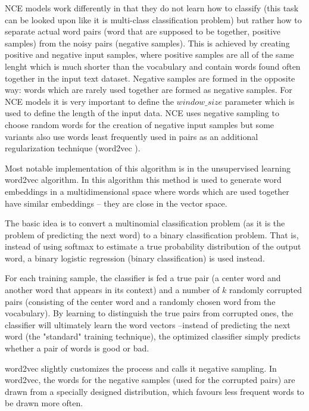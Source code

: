 \documentclass[b5paper]{book}
\let\cite\parencite
\begin{document}
NCE models work differently in that they do not learn how to classify (this task can be looked upon like it is multi-class classification problem) but rather how to separate actual word pairs (word that are supposed to be together, positive samples) from the noisy pairs (negative samples). This is achieved by creating positive and negative input samples, where positive samples are all of the same lenght which is much shorter than the vocabulary and contain words found often together in the input text dataset. Negative samples are formed in the opposite way: words which are rarely used together are formed as negative samples. For NCE models it is very important to define the \(window\_size\) parameter which is used to define the length of the input data. NCE uses negative sampling to choose random words for the creation of negative input samples but some variants also use words least frequently used in pairs as an additional regularization technique (word2vec \cite{mikolov2013efficient}).

Most notable implementation of this algorithm is in the unsupervised learning word2vec \cite{mikolov2013efficient} algorithm. In this algorithm this method is used to generate word embeddings in a multidimensional space where words which are used together have similar embeddings -- they are close in the vector space. 

The basic idea is to convert a multinomial classification problem (as it is the problem of predicting the next word) to a binary classification problem. That is, instead of using softmax to estimate a true probability distribution of the output word, a binary logistic regression (binary classification) is used instead.

For each training sample, the classifier is fed a true pair (a center word and another word that appears in its context) and a number of \(k\) randomly corrupted pairs (consisting of the center word and a randomly chosen word from the vocabulary). By learning to distinguish the true pairs from corrupted ones, the classifier will ultimately learn the word vectors --instead of predicting the next word (the "standard" training technique), the optimized classifier simply predicts whether a pair of words is good or bad.

word2vec \cite{mikolov2013efficient} slightly customizes the process and calls it negative sampling. In word2vec, the words for the negative samples (used for the corrupted pairs) are drawn from a specially designed distribution, which favours less frequent words to be drawn more often.
\end{document}
